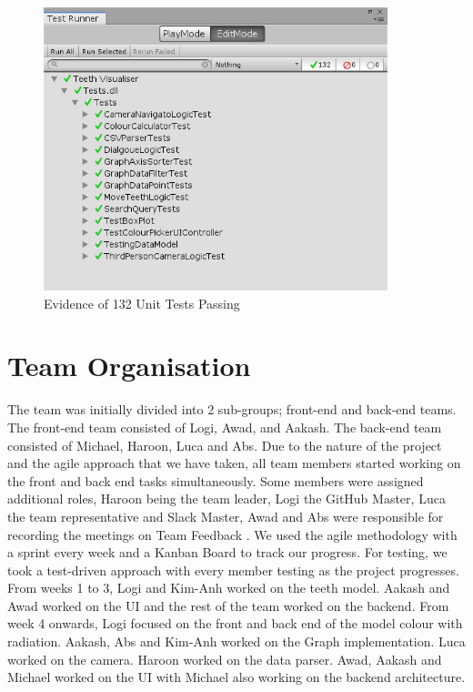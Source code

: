 \documentclass[11pt,english, titlepage]{article}
\begin{document}
    \begin{figure}[H]
      \begin{center}
        \includegraphics[width=100mm,scale=0.5]{test}
        \caption{Evidence of 132 Unit Tests Passing}
      \label{fig:test}
      \end{center}
    \end{figure}

  \section*{Team Organisation}
  The team was initially divided into 2 sub-groups; front-end and back-end teams.  The front-end team consisted of Logi, Awad,  and Aakash. The back-end team consisted of Michael, Haroon, Luca and Abs. Due to the nature of the project and the agile approach that we have taken, all team members started working on the front and back end tasks simultaneously. Some members were assigned additional roles, Haroon being the team leader, Logi the GitHub Master, Luca the team representative and Slack Master, Awad and Abs were responsible for recording the meetings on Team Feedback . We used the agile methodology with a sprint every week and a Kanban Board to track our progress. For testing, we took a test-driven approach with every member testing as the project progresses.  From weeks 1 to 3, Logi and Kim-Anh worked on the teeth model. Aakash and Awad worked on the UI and the rest of the team worked on the backend. From week 4 onwards, Logi focused on the front and back end of the model colour with radiation. Aakash, Abs and Kim-Anh worked on the Graph implementation. Luca worked on the camera. Haroon worked on the data parser. Awad, Aakash and Michael worked on the UI with Michael also working on the backend architecture.
  \\
\end{document}
